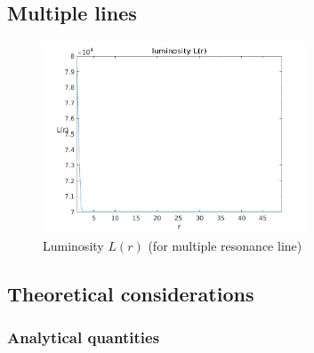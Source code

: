 \documentclass[../main/main.tex]{subfiles}
\begin{document}
\subsection{Multiple lines}
\begin{figure}[!htp]
\centering
\includegraphics[width=0.7\textwidth]{../../two_resonance_lines/figures/luminosity_multiple_resonance_line.png}
\caption{Luminosity $L(r)$ (for multiple resonance line)}
\label{luminosity_multiple_resonance_line}
\end{figure}

\subsection{Theoretical considerations}
\subsubsection{Analytical quantities}
\label{luminosity_analytical}
\end{document}
